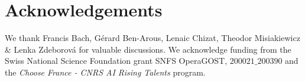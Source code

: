 \section*{Acknowledgements}

We thank Francis Bach, G\'erard Ben-Arous, Lenaic Chizat, Theodor Misiakiewicz \& Lenka Zdeborov\'a for valuable discussions. We acknowledge funding from the Swiss National Science Foundation grant SNFS OperaGOST, $200021\_200390$ and the \textit{Choose France - CNRS AI Rising Talents} program.

